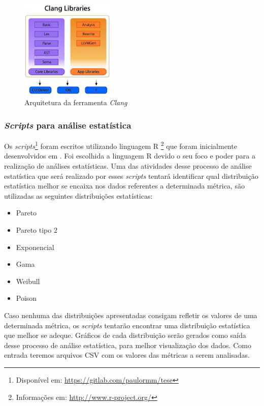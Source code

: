 \begin{figure}[h]
  \centering
  \includegraphics[width=0.4\textwidth]
      {figuras/clang_arch.eps}
      \caption{Arquitetura da ferramenta \emph{Clang} \cite{kremenek2009}}
  \label{clang_arch}
\end{figure}

\subsubsection{\textit{Scripts} para análise estatística} \label{scripts}

Os \textit{scripts}\footnote{Disponível em:
\url{https://gitlab.com/paulormm/tese}} foram escritos utilizando linguagem R
\footnote{Informações em: \url{http://www.r-project.org/}} que foram
inicialmente desenvolvidos em . Foi escolhida a linguagem R
devido o seu foco e poder para a realização de análises estatísticas. Uma das
atividades desse processo de análise estatística que será realizado
por esses \textit{scripts} tentará identificar qual distribuição estatística melhor se encaixa nos dados referentes a 
determinada métrica, são utilizadas as seguintes distribuições estatísticas:

\begin{itemize}
  \item Pareto
  \item Pareto tipo 2
  \item Exponencial
  \item Gama
  \item Weibull
  \item Poison
\end{itemize}

Caso nenhuma das distribuições apresentadas consigam refletir os valores de uma determinada métrica, os
\textit{scripts} tentarão encontrar uma distribuição estatística que melhor se adeque. Gráficos de cada distribuição serão
gerados como saída desse processo de análise estatística, para melhor visualização dos dados. Como entrada teremos arquivos
CSV com os valores das métricas a serem analisadas.

